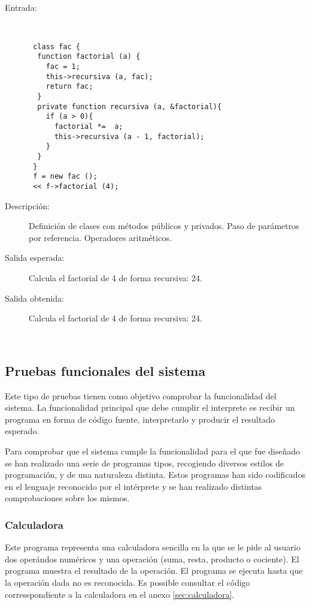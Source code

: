 \hfil \\
	\begin{description}
		\item [Entrada:] \hfill \\
\begin{lstlisting}
 class fac {
  function factorial (a) {
    fac = 1;
    this->recursiva (a, fac);
    return fac;
  }
  private function recursiva (a, &factorial){
    if (a > 0){
      factorial *=  a;
      this->recursiva (a - 1, factorial);
    } 
  }
 }
 f = new fac ();
 << f->factorial (4); 
\end{lstlisting}
		\item [Descripción:] Definición de clases con métodos públicos y privados. Paso de parámetros por referencia. Operadores aritméticos.
		\item [Salida esperada:] Calcula el factorial de 4 de forma recursiva: 24.
		\item [Salida obtenida:] Calcula el factorial de 4 de forma recursiva: 24.
	\end{description}
\hfil \\
\subsection{Pruebas funcionales del sistema}
Este tipo de pruebas tienen como objetivo comprobar la funcionalidad del sistema. La funcionalidad principal que debe cumplir el interprete 
es recibir un programa en forma de código fuente, interpretarlo y producir el resultado esperado.

Para comprobar que el sistema cumple la funcionalidad para el que fue diseñado se han realizado una serie de programas tipos, recogiendo diversos estilos de 
programación, y de una naturaleza distinta. Estos programas han sido codificados en el lenguaje reconocido por el intérprete y se han realizado distintas comprobaciones 
sobre los mismos.

\subsubsection{Calculadora}
Este programa representa una calculadora sencilla en la que se le pide al usuario dos operándos numéricos y una operación (suma, resta, producto o cociente). El 
programa muestra el resultado de la operación. El programa se ejecuta hasta que la operación dada no es reconocida. 
Es possible consultar el código corresspondiente a la calculadora en el anexo \ref{sec:calculadora}.

